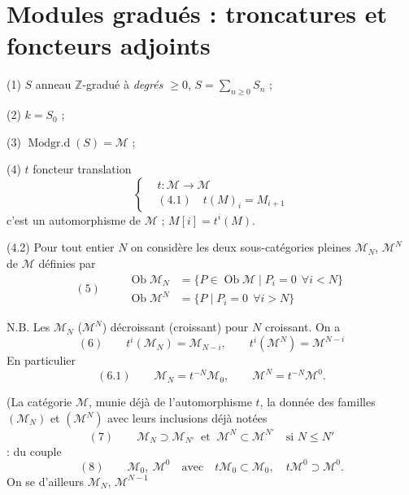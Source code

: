 \documentclass[11pt,a4paper]{article}
\begin{document}

\section{Modules gradués : troncatures et foncteurs adjoints}

(1) $S$ anneau $\mathbb{Z}$-gradué  à \emph{degrés $\geq 0$}, $S=\sum_{n\geq 0} S_n$  ;

(2) $k = S_0$ ;

(3) $\operatorname{Modgr.d}(S) = \mathcal{M}$ ;

(4) $t$ foncteur translation
\[
\left\{\begin{aligned}
&t : \mathcal{M}\to\mathcal{M}\\
&(4.1)\quad t(M)_i = M_{i+1}
\end{aligned}\right.
\]
c'est un automorphisme de $\mathcal{M}$ ; $M[i] = t^i(M)$.

(4.2)  Pour tout entier $N$ on considère les deux sous-catégories pleines  $\mathcal{M}_N$, $\mathcal{M}^N$ de $\mathcal{M}$ définies par
\[
(5)\qquad
\begin{aligned}
\operatorname{Ob}\mathcal{M}_N &= \{P\in\operatorname{Ob}\mathcal{M} \mid P_i = 0 \ \ \forall i<N\}\\
\operatorname{Ob}\mathcal{M}^N &= \{P \mid P_i = 0 \ \ \forall i>N\}
\end{aligned}
\]

N.B. Les $\mathcal{M}_N$ ($\mathcal{M}^N$) décroissant (croissant) pour $N$ croissant. On a
\[
(6)\qquad t^i(\mathcal{M}_N) = \mathcal{M}_{N-i}, \qquad t^i(\mathcal{M}^N) = \mathcal{M}^{N-i}
\]
 En particulier 
\[
(6.1)\qquad \mathcal{M}_N = t^{-N}\mathcal{M}_0, \qquad \mathcal{M}^N = t^{-N}\mathcal{M}^0 .
\]

 (La catégorie $\mathcal{M}$, munie déjà de l'automorphisme $t$, la donnée des familles $(\mathcal{M}_N)$ et $(\mathcal{M}^N)$ avec leurs inclusions déjà notées
\[
(7)\qquad \mathcal{M}_N\supset\mathcal{M}_{N'} \ \text{ et }\ \mathcal{M}^N\subset\mathcal{M}^{N'} \quad\text{si } N\leq N'
\]
 :  du couple
\[
(8)\qquad \mathcal{M}_0,\ \mathcal{M}^0 \quad\text{avec}\quad t\mathcal{M}_0\subset\mathcal{M}_0,\quad t\mathcal{M}^0\supset\mathcal{M}^0 .
\]
On se  d'ailleurs  $\mathcal{M}_N$, $\mathcal{M}^{N-1}$ \ill{}
\end{document}
